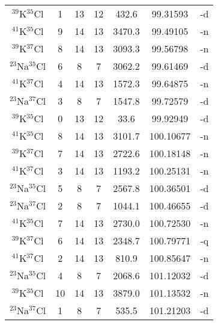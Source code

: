 \begin{table*}[htp]
\begin{tabular}{ccccccc}
$^{39}$K$^{35}$Cl & 1 & 13 & 12 & 432.6 & 99.31593 & -d \\
$^{41}$K$^{35}$Cl & 9 & 14 & 13 & 3470.3 & 99.49105 & -n \\
$^{39}$K$^{37}$Cl & 8 & 14 & 13 & 3093.3 & 99.56798 & -n \\
$^{23}$Na$^{35}$Cl & 6 & 8 & 7 & 3062.2 & 99.61469 & -d \\
$^{41}$K$^{37}$Cl & 4 & 14 & 13 & 1572.3 & 99.64875 & -n \\
$^{23}$Na$^{37}$Cl & 3 & 8 & 7 & 1547.8 & 99.72579 & -d \\
$^{39}$K$^{35}$Cl & 0 & 13 & 12 & 33.6 & 99.92949 & -d \\
$^{41}$K$^{35}$Cl & 8 & 14 & 13 & 3101.7 & 100.10677 & -n \\
$^{39}$K$^{37}$Cl & 7 & 14 & 13 & 2722.6 & 100.18148 & -n \\
$^{41}$K$^{37}$Cl & 3 & 14 & 13 & 1193.2 & 100.25131 & -n \\
$^{23}$Na$^{35}$Cl & 5 & 8 & 7 & 2567.8 & 100.36501 & -d \\
$^{23}$Na$^{37}$Cl & 2 & 8 & 7 & 1044.1 & 100.46655 & -d \\
$^{41}$K$^{35}$Cl & 7 & 14 & 13 & 2730.0 & 100.72530 & -n \\
$^{39}$K$^{37}$Cl & 6 & 14 & 13 & 2348.7 & 100.79771 & -q \\
$^{41}$K$^{37}$Cl & 2 & 14 & 13 & 810.9 & 100.85647 & -n \\
$^{23}$Na$^{35}$Cl & 4 & 8 & 7 & 2068.6 & 101.12032 & -d \\
$^{39}$K$^{35}$Cl & 10 & 14 & 13 & 3879.0 & 101.13532 & -n \\
$^{23}$Na$^{37}$Cl & 1 & 8 & 7 & 535.5 & 101.21203 & -d \\
\hline
\end{tabular}

\par 
\end{table*}
